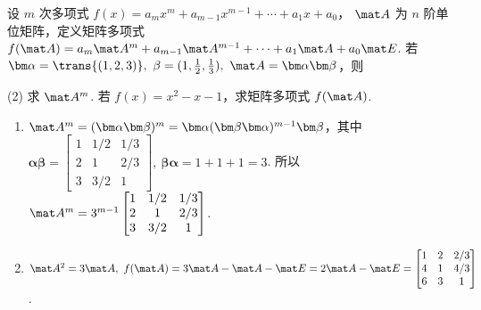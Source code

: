 \begin{problem}[本题10分]
  设 $m$ 次多项式
  $f(x) = a_mx^m + a_{m - 1}x^{m - 1} + \cdots + a_1x + a_0$，
  $\mat A$ 为 $n$ 阶单位矩阵，定义矩阵多项式
  $f(\mat A) = a_m\mat A^m + a_{m - 1}\mat A^{m - 1} + \cdots
             + a_1\mat A + a_0\mat E$.
  若 $\bm\alpha = \trans{(1,2,3)},~ \beta = (1, \frac12, \frac13),~
  \mat A = \bm\alpha\bm\beta$，则
  \begin{tasks}[ label = \arabic*. ](2)
    \task 求 $\mat A^m$.
    \task 若 $f(x) = x^2 - x - 1$，求矩阵多项式 $f(\mat A)$.
  \end{tasks}
\end{problem}
\scratch[2ex]
\begin{solution}\leavevmode
  \begin{enumerate}
    \item
    $ \mat A^m = (\bm\alpha\bm\beta)^m
    = \bm\alpha(\bm\beta\bm\alpha)^{m-1}\bm\beta$，其中
    $\bm\alpha\bm\beta =
    \begin{bmatrix}
      1 & 1/2 & 1/3\\
      2 & 1       & 2/3\\
      3 & 3/2 & 1
    \end{bmatrix},~ \bm\beta\bm\alpha = 1 + 1 + 1 = 3$.
    所以 $\mat A^m = 3^{m - 1}
    \begin{bmatrix}
      1 & 1/2 & 1/3\\
      2 & 1   & 2/3\\
      3 & 3/2 & 1
    \end{bmatrix}$.
    \item $\mat A^2 = 3\mat A,~
      f(\mat A) = 3\mat A - \mat A - \mat E = 2\mat A - \mat E
    = \begin{bmatrix}
      1 & 2 & 2/3\\
      4 & 1 & 4/3\\
      6 & 3 & 1
    \end{bmatrix}$.
  \end{enumerate}
\end{solution}


